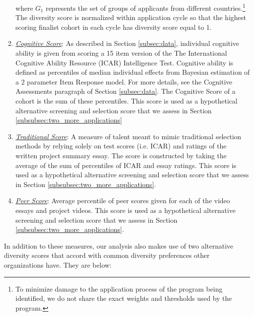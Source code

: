 \begin{enumerate}
\noindent where $G_1$ represents the set of groups of applicants from different countries.\footnote{To minimize damage to the application process of the program being identified, we do not share the exact weights and thresholds used by the program.} The diversity score is normalized within application cycle so that the highest scoring finalist cohort in each cycle has diversity score equal to 1. 

\item \underline{\emph{Cognitive Score}}: As described in Section \ref{subsec:data}, individual cognitive ability is given from scoring a 15 item version of the The International Cognitive Ability Resource (ICAR) Intelligence Test. Cognitive ability is defined as percentiles of median individual effects from Bayesian estimation of a 2 parameter Item Response model. For more details, see the Cognitive Assessments paragraph of Section \ref{subsec:data}. The Cognitive Score of a cohort is the sum of these percentiles. This score is used as a hypothetical alternative screening and selection score that we assess in Section \ref{subsubsec:two_more_applications}
\item \underline{\emph{Traditional Score}}: A measure of talent meant to mimic traditional selection methods by relying solely on test scores (i.e. ICAR) and ratings of the written project summary essay. The score is constructed by taking the average of the sum of percentiles of ICAR and essay ratings. This score is used as a hypothetical alternative screening and selection score that we assess in Section \ref{subsubsec:two_more_applications}.
\item \underline{\emph{Peer Score}}: Average percentile of peer scores given for each of the video essays and project videos. This score is used as a hypothetical alternative screening and selection score that we assess in Section \ref{subsubsec:two_more_applications}.
\end{enumerate}

In addition to these measures, our analysis also makes use of two alternative diversity scores that accord with common diversity preferences other organizations have. They are below:

